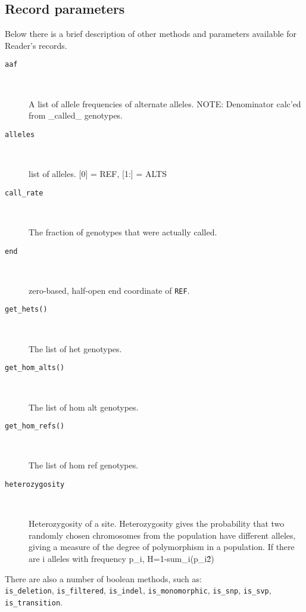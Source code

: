 \subsection{Record parameters}

\noindent Below there is a brief description of other methods and parameters available for Reader's records.

\begin{description}
  \item[\texttt{aaf}] \

   A list of allele frequencies of alternate alleles. NOTE: Denominator calc’ed from \_called\_ genotypes.

  \item[\texttt{alleles}] \

   list of alleles. [0] = REF, [1:] = ALTS

  \item[\texttt{call\_rate}] \

  The fraction of genotypes that were actually called.

  \item[\texttt{end}] \

  zero-based, half-open end coordinate of \verb|REF|.

  \item[\texttt{get\_hets()}] \

    The list of het genotypes.

  \item[\texttt{get\_hom\_alts()}] \

    The list of hom alt genotypes.

  \item[\texttt{get\_hom\_refs()}] \

    The list of hom ref genotypes.

  \item[\texttt{heterozygosity}] \

    Heterozygosity of a site. Heterozygosity gives the probability that two randomly chosen chromosomes from the
    population have different alleles, giving a measure of the degree of polymorphism in a population.
    If there are i alleles with frequency p\_i, H=1-sum\_i(p\_i\^2)

\end{description}

\noindent There are also a number of boolean methods, such as: \\

\verb|is_deletion|, \verb|is_filtered|, \verb|is_indel|, \verb|is_monomorphic|, \verb|is_snp|, \verb|is_svp|, \verb|is_transition|.

